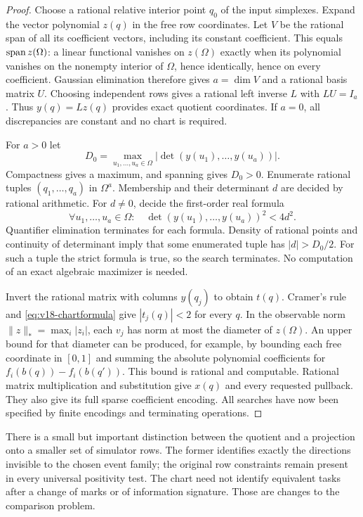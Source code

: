 \begin{proof}
Choose a rational relative interior point $q_0$ of the input simplexes.
Expand the vector polynomial $z(q)$ in the free row coordinates. Let $V$
be the rational span of all its coefficient vectors, including its constant
coefficient. This equals $\operatorname{span} z(\Omega)$: a linear functional vanishes
on $z(\Omega)$ exactly when its polynomial vanishes on the nonempty
interior of $\Omega$, hence identically, hence on every coefficient.
Gaussian elimination therefore gives $a=\dim V$ and a rational basis
matrix $U$. Choosing independent rows gives a rational left inverse $L$
with $LU=I_a$. Thus $y(q)=Lz(q)$ provides exact quotient coordinates.
If $a=0$, all discrepancies are constant and no chart is required.

For $a>0$ let
\[
 D_0=\max_{u_1,\ldots,u_a\in\Omega}
             |\det(y(u_1),\ldots,y(u_a))|.
\]
Compactness gives a maximum, and spanning gives $D_0>0$. Enumerate rational
tuples $(q_1,\ldots,q_a)$ in $\Omega^a$. Membership and their determinant
$d$ are decided by rational arithmetic. For $d\ne0$, decide the
first-order real formula
\begin{equation}\label{eq:v18-chartformula}
 \forall u_1,\ldots,u_a\in\Omega:\quad
 \det(y(u_1),\ldots,y(u_a))^2<4d^2.
\end{equation}
Quantifier elimination terminates for each formula. Density of rational
points and continuity of determinant imply that some enumerated tuple
has $|d|>D_0/2$. For such a tuple the strict formula is true, so the
search terminates. No computation of an exact algebraic maximizer is
needed.

Invert the rational matrix with columns $y(q_j)$ to obtain $t(q)$.
Cramer's rule and \eqref{eq:v18-chartformula} give $|t_j(q)|<2$ for every
$q$. In the observable norm $\|z\|_* =\max_i|z_i|$, each $v_j$ has norm
at most the diameter of $z(\Omega)$. An upper bound for that diameter can
be produced, for example, by bounding each free coordinate in $[0,1]$
and summing the absolute polynomial coefficients for
$f_i(b(q))-f_i(b(q'))$. This bound is rational and computable. Rational
matrix multiplication and substitution give $x(q)$ and every requested
pullback. They also give its full sparse coefficient encoding. All
searches have now been specified by finite encodings and terminating
operations.
\end{proof}

There is a small but important distinction between the quotient and a
projection onto a smaller set of simulator rows. The former identifies
exactly the directions invisible to the chosen event family; the original
row constraints remain present in every universal positivity test. The
chart need not identify equivalent tasks after a change of marks or of
information signature. Those are changes to the comparison problem.
